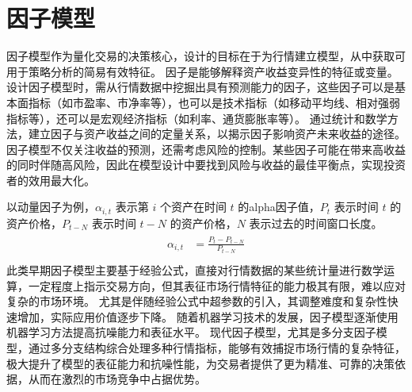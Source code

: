 \section{因子模型}

因子模型作为量化交易的决策核心，设计的目标在于为行情建立模型，从中获取可用于策略分析的简易有效特征。
因子是能够解释资产收益变异性的特征或变量。
设计因子模型时，需从行情数据中挖掘出具有预测能力的因子，这些因子可以是基本面指标（如市盈率、市净率等），也可以是技术指标（如移动平均线、相对强弱指标等），还可以是宏观经济指标（如利率、通货膨胀率等）。
通过统计和数学方法，建立因子与资产收益之间的定量关系，以揭示因子影响资产未来收益的途径。
因子模型不仅关注收益的预测，还需考虑风险的控制。某些因子可能在带来高收益的同时伴随高风险，因此在模型设计中要找到风险与收益的最佳平衡点，实现投资者的效用最大化。


以动量因子为例，$\alpha_{i,t}$ 表示第 $i$ 个资产在时间 $t$ 的alpha因子值，$P_{t}$ 表示时间 $t$ 的资产价格，$P_{t-N}$ 表示时间 $t-N$ 的资产价格，$N$ 表示过去的时间窗口长度。
\begin{align}
    \begin{split}
        \alpha_{i,t} &= \frac{P_{t} - P_{t-N}}{P_{t-N}} \\
    \end{split}
\end{align}
此类早期因子模型主要基于经验公式，直接对行情数据的某些统计量进行数学运算，一定程度上指示交易方向，但其表征市场行情特征的能力极其有限，难以应对复杂的市场环境。
尤其是伴随经验公式中超参数的引入，其调整难度和复杂性快速增加，实际应用价值逐步下降。
随着机器学习技术的发展，因子模型逐渐使用机器学习方法提高抗噪能力和表征水平。
现代因子模型，尤其是多分支因子模型，通过多分支结构综合处理多种行情指标，能够有效捕捉市场行情的复杂特征，极大提升了模型的表征能力和抗噪性能，为交易者提供了更为精准、可靠的决策依据，从而在激烈的市场竞争中占据优势。

